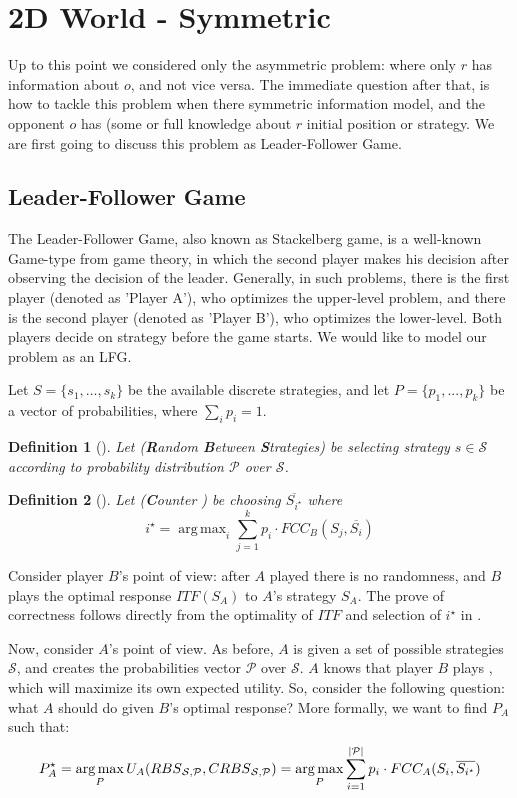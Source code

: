 \documentclass[a4paper,10pt]{article}
\newtheorem{definition}{Definition}
\newcommand{\fb}[1]{\dofb#1}
\newcommand{\dofb}[1]{\textbf{#1}}
\newcommand\rob{\ensuremath{r}\xspace}
\newcommand\opp{\ensuremath{o}\xspace}
\newcommand{\fcc}{\ensuremath{FCC}\xspace}
\newcommand{\itf}{\ensuremath{ITF}\xspace}
\DeclarePairedDelimiter\abs{\lvert}{\rvert}%
\DeclareMathOperator*{\argmax}{arg\,max} %
\begin{document}
\section{2D World - Symmetric}
Up to this point we considered only the asymmetric problem: where only \rob has information about \opp, and not vice versa. The immediate question after that, is how to tackle this problem when there symmetric information model, and the opponent \opp has (some or full knowledge about \rob initial position or strategy.
We are first going to discuss this problem as Leader-Follower Game.

\subsection{Leader-Follower Game}
The Leader-Follower Game, also known as Stackelberg game, is a well-known Game-type from game theory, in which the second player makes his decision after observing the decision of the leader. 
Generally, in such problems, there is the first player (denoted as 'Player A'), who optimizes the upper-level problem, and there is the second player (denoted as 'Player B'), who optimizes the lower-level. Both players decide on strategy before the game starts. We would like to model our problem as an LFG.

Let $S=\{s_1,\hdots,s_k\}$ be the available discrete strategies, and let $P=\{p_1,...,p_k\}$ be a vector of probabilities, where $\sum_i p_i=1$.

\begin{definition} [\rbs]
Let \rbs (\fb{Random} \fb{Between} \fb{Strategies}) be selecting strategy $s \in \mathcal{S}$ according to probability distribution $\mathcal{P}$ over $\mathcal{S}$. 
\end{definition}


\begin{definition}[\crbs]
Let \crbs (\fb{Counter} \rbs) be choosing $\overline{S_{i^\star}}$ where \[i^\star=\argmax_i\sum_{j=1}^{k} p_i\cdot\fcc_B(S_j,\overline{S_i})\]
\end{definition}

Consider player $B$'s point of view: after $A$ played there is no randomness, and $B$ plays the optimal response $\itf(S_A)$ to $A$'s strategy $S_A$. The prove of correctness follows directly from the optimality of \itf and selection of $i^{\star}$ in \crbs.

Now, consider $A$'s point of view. As before, $A$ is given a set of possible strategies $\mathcal{S}$, and creates the probabilities vector $\mathcal{P}$ over $\mathcal{S}$.
$A$ knows that player $B$ plays \crbs, which will maximize its own expected utility.
So, consider the following question: what $A$ should do given $B$'s optimal response? More formally, we want to find $P_A$ such that:
\[P_A^{\star}=\argmax_{P}{U_A(\rbs,\crbs)}=\argmax_{P}{\sum_{i=1}^{\abs*{\mathcal{P}}}p_i\cdot \fcc_A(S_i,\overline{S_{i^{\star}}})}\]
\end{document}
